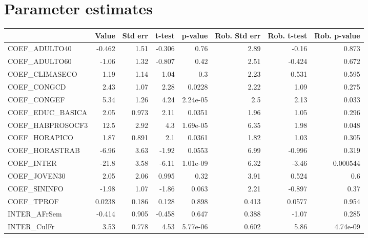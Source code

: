 \section{Parameter estimates}
\begin{tabular}{lrrrrrrr}
\toprule
{} &  Value &  Std err &  t-test &  p-value &  Rob. Std err &  Rob. t-test &  Rob. p-value \\
\midrule
COEF\_ADULTO40      & -0.462 &     1.51 &  -0.306 &     0.76 &          2.89 &        -0.16 &         0.873 \\
COEF\_ADULTO60      &  -1.06 &     1.32 &  -0.807 &     0.42 &          2.51 &       -0.424 &         0.672 \\
COEF\_CLIMASECO     &   1.19 &     1.14 &    1.04 &      0.3 &          2.23 &        0.531 &         0.595 \\
COEF\_CONGCD        &   2.43 &     1.07 &    2.28 &   0.0228 &          2.22 &         1.09 &         0.275 \\
COEF\_CONGEF        &   5.34 &     1.26 &    4.24 & 2.24e-05 &           2.5 &         2.13 &         0.033 \\
COEF\_EDUC\_BASICA   &   2.05 &    0.973 &    2.11 &   0.0351 &          1.96 &         1.05 &         0.296 \\
COEF\_HABPROSOCF3   &   12.5 &     2.92 &     4.3 & 1.69e-05 &          6.35 &         1.98 &         0.048 \\
COEF\_HORAPICO      &   1.87 &    0.891 &     2.1 &   0.0361 &          1.82 &         1.03 &         0.305 \\
COEF\_HORASTRAB     &  -6.96 &     3.63 &   -1.92 &   0.0553 &          6.99 &       -0.996 &         0.319 \\
COEF\_INTER         &  -21.8 &     3.58 &   -6.11 & 1.01e-09 &          6.32 &        -3.46 &      0.000544 \\
COEF\_JOVEN30       &   2.05 &     2.06 &   0.995 &     0.32 &          3.91 &        0.524 &           0.6 \\
COEF\_SININFO       &  -1.98 &     1.07 &   -1.86 &    0.063 &          2.21 &       -0.897 &          0.37 \\
COEF\_TPROF         & 0.0238 &    0.186 &   0.128 &    0.898 &         0.413 &       0.0577 &         0.954 \\
INTER\_AFrSem       & -0.414 &    0.905 &  -0.458 &    0.647 &         0.388 &        -1.07 &         0.285 \\
INTER\_CulFr        &   3.53 &    0.778 &    4.53 & 5.77e-06 &         0.602 &         5.86 &      4.74e-09 \\

\end{tabular}
